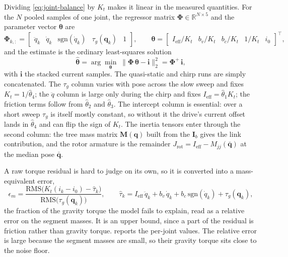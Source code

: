 Dividing \cref{eq:joint-balance} by $K_t$ makes it linear in the measured quantities. For the $N$
pooled samples of one joint, the regressor matrix $\boldsymbol\Phi \in \mathbb R^{N\times 5}$ and the
parameter vector $\boldsymbol\theta$ are
\begin{equation}
\boldsymbol\Phi_{k,:} = \begin{bmatrix} \ddot q_k & \dot q_k & \mathrm{sgn}(\dot q_k) & \tau_g(\mathbf q_k) & 1 \end{bmatrix},
\qquad
\boldsymbol\theta = \begin{bmatrix} I_{\mathrm{eff}}/K_t & b_v/K_t & b_c/K_t & 1/K_t & i_0 \end{bmatrix}^{\!\top},
\label{eq:regressor}
\end{equation}
and the estimate is the ordinary least-squares solution
\begin{equation}
\hat{\boldsymbol\theta} = \arg\min_{\boldsymbol\theta}\;\bigl\|\boldsymbol\Phi\,\boldsymbol\theta - \mathbf i\bigr\|_2^2
                        = \boldsymbol\Phi^{+}\,\mathbf i,
\label{eq:ls-fit}
\end{equation}
with $\mathbf i$ the stacked current samples. The quasi-static and chirp runs are simply
concatenated. The $\tau_g$ column varies with pose across the slow sweep and fixes
$K_t = 1/\hat\theta_4$; the $\ddot q$ column is large only during the chirp and fixes
$I_{\mathrm{eff}} = \hat\theta_1 K_t$; the friction terms follow from $\hat\theta_2$ and
$\hat\theta_3$. The intercept column is essential: over a short sweep $\tau_g$ is itself mostly
constant, so without it the drive's current offset lands in $\hat\theta_4$ and can flip the sign of
$K_t$. The inertia tensors enter through the second column: the tree mass matrix $\mathbf M(\mathbf q)$
built from the $\mathbf I_b$ gives the link contribution, and the rotor armature is the remainder
$J_{\mathrm{rot}} = I_{\mathrm{eff}} - M_{jj}(\bar{\mathbf q})$ at the median pose $\bar{\mathbf q}$.

A raw torque residual is hard to judge on its own, so it is converted into a mass-equivalent error,
\begin{equation}
\epsilon_m = \frac{\mathrm{RMS}\bigl(K_t(i_k - i_0) - \hat\tau_k\bigr)}{\mathrm{RMS}\bigl(\tau_g(\mathbf q_k)\bigr)},
\qquad
\hat\tau_k = I_{\mathrm{eff}}\,\ddot q_k + b_v\,\dot q_k + b_c\,\mathrm{sgn}(\dot q_k) + \tau_g(\mathbf q_k),
\label{eq:mass-error}
\end{equation}
the fraction of the gravity torque the model fails to explain, read as a relative error on the
segment masses. It is an upper bound, since a part of the residual is friction rather than gravity
torque.  reports the per-joint values. The relative error is large
because the segment masses are small, so their gravity torque sits close to the noise floor.

